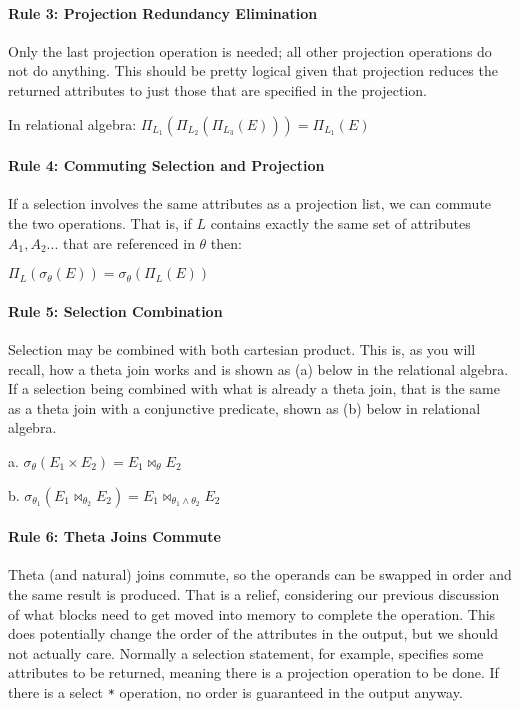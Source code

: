 \paragraph{Rule 3: Projection Redundancy Elimination}

Only the last projection operation is needed; all other projection operations do not do anything. This should be pretty logical given that projection reduces the returned attributes to just those that are specified in the projection.

In relational algebra: $\Pi_{L_{1}}(\Pi_{L_{2}}(\Pi_{L_{3}}(E))) = \Pi_{L_{1}}(E)$

\paragraph{Rule 4: Commuting Selection and Projection}
If a selection involves the same attributes as a projection list, we can commute the two operations. That is, if $L$ contains exactly the same set of attributes $A_{1}, A_{2}...$ that are referenced in $\theta$ then:

$\Pi_{L}(\sigma_{\theta}(E)) = \sigma_{\theta}(\Pi_{L}(E))$

\paragraph{Rule 5: Selection Combination}

Selection may be combined with both cartesian product. This is, as you will recall, how a theta join works and is shown as (a) below in the relational algebra. If a selection being combined with what is already a theta join, that is the same as a theta join with a conjunctive predicate, shown as (b) below in relational algebra.

a. $\sigma_{\theta}(E_{1} \times E_{2}) = E_{1} \bowtie_{\theta} E_{2}$

b. $\sigma_{\theta_{1}}( E_{1} \bowtie_{\theta_{2}} E_{2}) = E_{1} \bowtie_{\theta_{1}\wedge\theta_{2}} E_{2}$

\paragraph{Rule 6: Theta Joins Commute}
Theta (and natural) joins commute, so the operands can be swapped in order and the same result is produced. That is a relief, considering our previous discussion of what blocks need to get moved into memory to complete the operation. This does potentially change the order of the attributes in the output, but we should not actually care. Normally a selection statement, for example, specifies some attributes to be returned, meaning there is a projection operation to be done. If there is a select \texttt{*} operation, no order is guaranteed in the output anyway.

